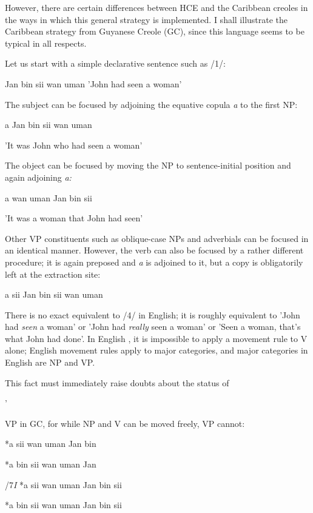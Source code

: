 However, there are certain differences between HCE and the Caribbean creoles in the ways in which this general strategy is imple\-mented. I shall illustrate the Caribbean strategy from Guyanese Creole (GC), since this language seems to be typical in all respects.

Let us start with a simple declarative sentence such as /1/:

\ea\label{ex:1}
 Jan bin sii wan uman 'John had seen a woman'
\glt
\z

The subject can be focused by adjoining the equative copula \textit{a} to the first NP:

\ea\label{ex:2}
 a Jan bin sii wan uman
\glt
\z

'It was John who had seen a woman'

The object can be focused by moving the NP to sentence-initial position and again adjoining \textit{a:}

\ea\label{ex:3}
 a wan uman Jan bin sii
\glt
\z

'It was a woman that John had seen'

Other VP constituents such as oblique-case NPs and adverbials can be focused in an identical manner. However, the verb can also be focused by a rather different procedure; it is again preposed and \textit{a} is adjoined to it, but a copy is obligatorily left at the extraction site:

\ea\label{ex:4}
 a sii Jan bin sii wan uman
\glt
\z

There is no exact equivalent to /4/ in English; it is roughly equivalent to 'John had \textit{seen} a woman' or 'John had \textit{really }seen a woman' or 'Seen a woman, that's what John had done'. In English , it is impossible to apply a movement rule to V alone; English movement rules apply to major categories, and major categories in English are NP and VP.

This fact must immediately raise doubts about the status of

'


VP in GC, for while NP and V can be moved freely, VP cannot:

\ea\label{ex:5}
 *a sii wan uman Jan bin
\glt
\z

\ea\label{ex:6}
 *a bin sii wan uman Jan
\glt
\z

/7\textit{I} *a sii wan uman Jan bin sii

\ea\label{ex:8}
 *a bin sii wan uman Jan bin sii
\glt
\z

